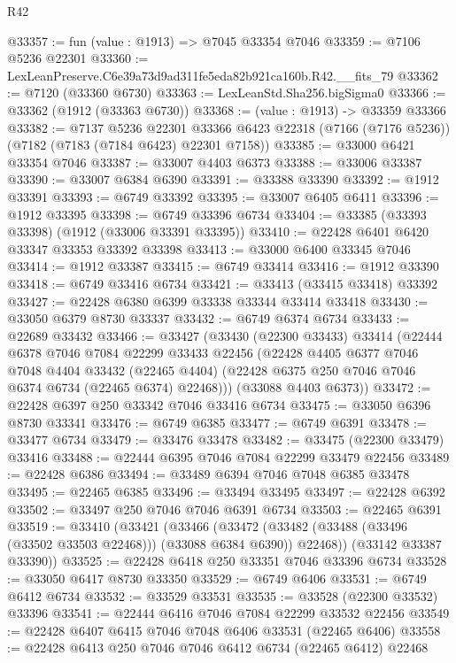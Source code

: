 \begin{lexlean}{R42}
\begin{coremodule}
{@33357 := fun (value : @1913) => @7045 @33354 @7046
@33359 := @7106 @5236 @22301
@33360 := LexLeanPreserve.C6e39a73d9ad311fe5eda82b921ca160b.R42.__fits_79
@33362 := @7120 (@33360 @6730)
@33363 := LexLeanStd.Sha256.bigSigma0
@33366 := @33362 (@1912 (@33363 @6730))
@33368 := (value : @1913) -> @33359 @33366
@33382 := @7137
    @5236
    @22301
    @33366
    @6423
    @22318
    (@7166 (@7176 @5236))
    (@7182 (@7183 (@7184 @6423) @22301 @7158))
@33385 := @33000 @6421 @33354 @7046
@33387 := @33007 @4403 @6373
@33388 := @33006 @33387
@33390 := @33007 @6384 @6390
@33391 := @33388 @33390
@33392 := @1912 @33391
@33393 := @6749 @33392
@33395 := @33007 @6405 @6411
@33396 := @1912 @33395
@33398 := @6749 @33396 @6734
@33404 := @33385 (@33393 @33398) (@1912 (@33006 @33391 @33395))
@33410 := @22428 @6401 @6420 @33347 @33353 @33392 @33398
@33413 := @33000 @6400 @33345 @7046
@33414 := @1912 @33387
@33415 := @6749 @33414
@33416 := @1912 @33390
@33418 := @6749 @33416 @6734
@33421 := @33413 (@33415 @33418) @33392
@33427 := @22428 @6380 @6399 @33338 @33344 @33414 @33418
@33430 := @33050 @6379 @8730 @33337
@33432 := @6749 @6374 @6734
@33433 := @22689 @33432
@33466 := @33427
    (@33430
      (@22300 @33433)
      @33414
      (@22444
        @6378
        @7046
        @7084
        @22299
        @33433
        @22456
        (@22428
          @4405
          @6377
          @7046
          @7048
          @4404
          @33432
          (@22465 @4404)
          (@22428 @6375 @250 @7046 @7046 @6374 @6734 (@22465 @6374) @22468)))
      (@33088 @4403 @6373))
@33472 := @22428 @6397 @250 @33342 @7046 @33416 @6734
@33475 := @33050 @6396 @8730 @33341
@33476 := @6749 @6385
@33477 := @6749 @6391
@33478 := @33477 @6734
@33479 := @33476 @33478
@33482 := @33475 (@22300 @33479) @33416
@33488 := @22444 @6395 @7046 @7084 @22299 @33479 @22456
@33489 := @22428 @6386
@33494 := @33489 @6394 @7046 @7048 @6385 @33478
@33495 := @22465 @6385
@33496 := @33494 @33495
@33497 := @22428 @6392
@33502 := @33497 @250 @7046 @7046 @6391 @6734
@33503 := @22465 @6391
@33519 := @33410
    (@33421
      (@33466
        (@33472 (@33482 (@33488 (@33496 (@33502 @33503 @22468))) (@33088 @6384 @6390)) @22468))
      (@33142 @33387 @33390))
@33525 := @22428 @6418 @250 @33351 @7046 @33396 @6734
@33528 := @33050 @6417 @8730 @33350
@33529 := @6749 @6406
@33531 := @6749 @6412 @6734
@33532 := @33529 @33531
@33535 := @33528 (@22300 @33532) @33396
@33541 := @22444 @6416 @7046 @7084 @22299 @33532 @22456
@33549 := @22428 @6407 @6415 @7046 @7048 @6406 @33531 (@22465 @6406)
@33558 := @22428 @6413 @250 @7046 @7046 @6412 @6734 (@22465 @6412) @22468
}
\end{coremodule}
\end{lexlean}
